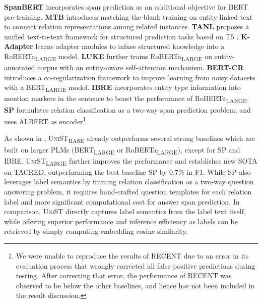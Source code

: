 \documentclass[11pt]{article}
\newcommand{\model}{\textsc{UniST}\xspace}
\newcommand{\basemodel}{\textsc{UniST}\textsubscript{BASE}}
\newcommand{\largemodel}{\textsc{UniST}\textsubscript{LARGE}}
\newcommand{\stitle}[1]{\vspace{1ex} \noindent{\bf #1}}
\begin{document}
\stitle{Baselines.} \textbf{SpanBERT} \cite{joshi-etal-2020-spanbert} incorporates span prediction as an additional objective for BERT pre-training. \textbf{MTB} \cite{baldini-soares-etal-2019-matching} introduces matching-the-blank training on entity-linked text to connect relation representations among related instances. \textbf{TANL} \cite{paolini2021structured} proposes a unified text-to-text framework for structured prediction tasks based on T5 \cite{2020t5}. \textbf{K-Adapter} \cite{wang-etal-2021-k} learns adapter modules to infuse structured knowledge into a RoBERTa\textsubscript{LARGE} model. \textbf{LUKE} further trains RoBERTa\textsubscript{LARGE} on entity-annotated corpus with an entity-aware self-attention mechanism. \textbf{BERT-CR} \cite{zhou-chen-2021-learning} introduces a co-regularization framework to improve learning from noisy datasets with a BERT\textsubscript{LARGE} model. \textbf{IBRE} \cite{zhou-chen-2021-learning} incorporates entity type information into mention markers in the sentence to boost the performance of RoBERTa\textsubscript{LARGE}. \textbf{SP} \cite{cohen2020relation} formulates relation classification as a two-way span prediction problem, and uses ALBERT \cite{Lan2020ALBERT:} as encoder\footnote{We were unable to reproduce the results of RECENT \cite{lyu-chen-2021-relation} due to an error in its evaluation process that wrongly corrected all false positive predictions during testing. After correcting that error, the performance of RECENT was observed to be below the other baselines, and hence has not been included in the result discussion.}. 



\stitle{Results.} As shown in , \basemodel\xspace already outperforms several strong baselines which are built on larger PLMs (BERT\textsubscript{LARGE} or RoBERTa\textsubscript{LARGE}), except for SP and IBRE. \largemodel\xspace further improves the performance and establishes new SOTA on TACRED, outperforming the best baseline SP by 0.7\% in F1. While SP also leverages label semantics by framing relation classification as a two-way question answering problem, it requires hand-crafted question templates for each relation label and more significant computational cost for answer span prediction. In comparison, \model directly captures label semantics from the label text itself, while offering superior performance and inference efficiency as labels can be retrieved by simply computing embedding cosine similarity.
\end{document}
